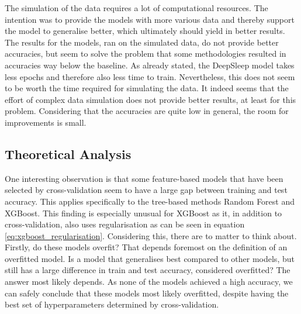 \documentclass[11pt]{scrartcl}
\begin{document}
The simulation of the data requires a lot of computational resources. The intention was to provide the models with more various data and thereby support the model to generalise better, which ultimately should yield in better results. The results for the models, ran on the simulated data, do not provide better accuracies, but seem to solve the problem that some methodologies resulted in accuracies way below the baseline. As already stated, the DeepSleep model takes less epochs and therefore also less time to train. Nevertheless, this does not seem to be worth the time required for simulating the data. It indeed seems that the effort of complex data simulation does not provide better results, at least for this problem. Considering that the accuracies are quite low in general, the room for improvements is small.

\subsection{Theoretical Analysis}

One interesting observation is that some feature-based models that have been selected by cross-validation seem to have a large gap between training and test accuracy. This applies specifically to the tree-based methods Random Forest and XGBoost. This finding is especially unusual for XGBoost as it, in addition to cross-validation, also uses regularisation as can be seen in equation \ref{eq:xgboost_regularisation}. Considering this, there are to matter to think about. Firstly, do these models overfit? That depends foremost on the definition of an overfitted model. Is a model that generalises best compared to other models, but still has a large difference in train and test accuracy, considered overfitted? The answer most likely depends. As none of the models achieved a high accuracy, we can safely conclude that these models most likely overfitted, despite having the best set of hyperparameters determined by cross-validation.
\end{document}
